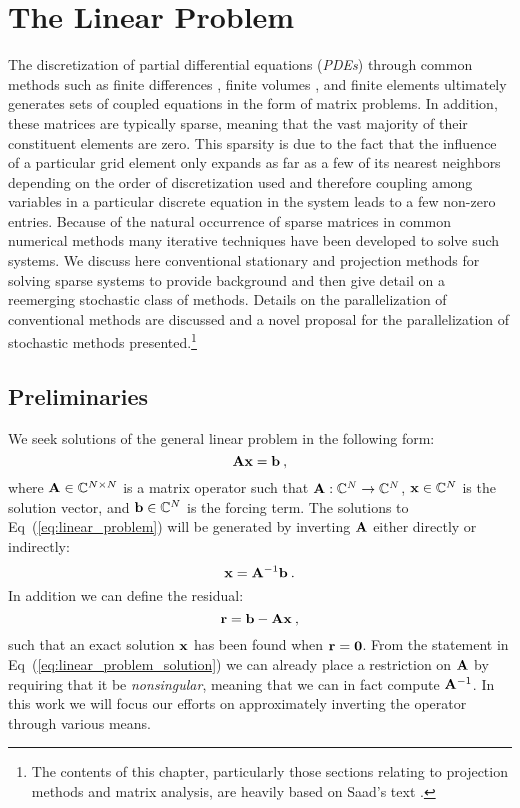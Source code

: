 \chapter{The Linear Problem}
\label{ch:linear_problem}
The discretization of partial differential equations (\textit{PDEs})
through common methods such as finite differences
\citep{leveque_finite_2007}, finite volumes
\citep{leveque_finite_2002}, and finite elements
\citep{zienkiewicz_finite_2005} ultimately generates sets of coupled
equations in the form of matrix problems.  In addition, these matrices
are typically sparse, meaning that the vast majority of their
constituent elements are zero. This sparsity is due to the fact that
the influence of a particular grid element only expands as far as a
few of its nearest neighbors depending on the order of discretization
used and therefore coupling among variables in a particular discrete
equation in the system leads to a few non-zero entries. Because of the
natural occurrence of sparse matrices in common numerical methods many
iterative techniques have been developed to solve such systems. We
discuss here conventional stationary and projection methods for
solving sparse systems to provide background and then give detail on a
reemerging stochastic class of methods. Details on the parallelization
of conventional methods are discussed and a novel proposal for the
parallelization of stochastic methods presented.\footnote{The contents
  of this chapter, particularly those sections relating to projection
  methods and matrix analysis, are heavily based on Saad's text
  \citep{saad_iterative_2003}.}

\section{Preliminaries}
\label{sec:linear_preliminaries}
We seek solutions of the general linear problem in the following form:
\begin{equation}
  \mathbf{A} \mathbf{x} = \mathbf{b}\:,
  \label{eq:linear_problem}
\end{equation}
where $\mathbf{A} \in \mathbb{C}^{N \times N}$ is a matrix operator such
that $\mathbf{A} : \mathbb{C}^{N} \rightarrow \mathbb{C}^{N}$, $\mathbf{x} \in
\mathbb{C}^N$ is the solution vector, and $\mathbf{b} \in \mathbb{C}^N$ is
the forcing term. The solutions to Eq~(\ref{eq:linear_problem}) will
be generated by inverting $\mathbf{A}$ either directly or indirectly:
\begin{equation}
  \mathbf{x} = \mathbf{A}^{-1} \mathbf{b}
  \label{eq:linear_problem_solution}\:.
\end{equation}
In addition we can define the residual:
\begin{equation}
  \mathbf{r} = \mathbf{b} - \mathbf{A}\mathbf{x}\:,
  \label{eq:linear_residual}
\end{equation}
such that an exact solution $\mathbf{x}$ has been found when
$\mathbf{r}=\mathbf{0}$.  From the statement in
Eq~(\ref{eq:linear_problem_solution}) we can already place a
restriction on $\mathbf{A}$ by requiring that it be \textit{nonsingular},
meaning that we can in fact compute $\mathbf{A}^{-1}$. In this work we
will focus our efforts on approximately inverting the operator through
various means.

